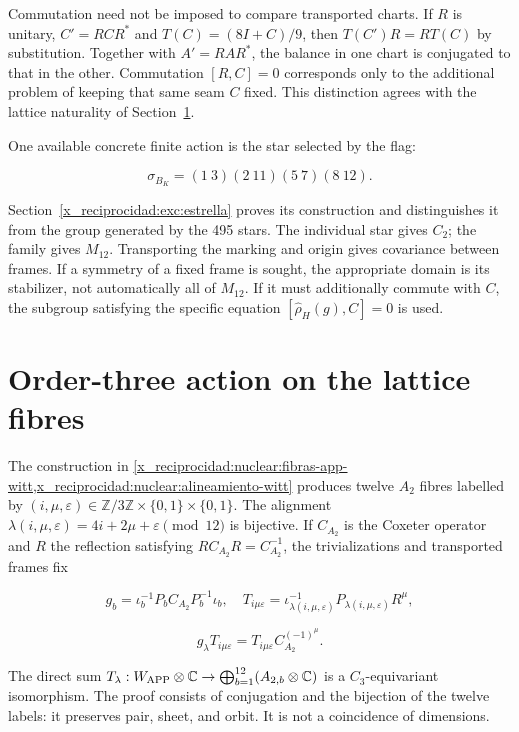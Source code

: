 Commutation need not be imposed to compare transported charts. If \(R\) is unitary, \(C'=RCR^*\) and \(T(C)=(8I+C)/9\), then \(T(C')R=RT(C)\) by substitution. Together with \(A'=RAR^*\), the balance in one chart is conjugated to that in the other. Commutation \([R,C]=0\) corresponds only to the additional problem of keeping that same seam \(C\) fixed. This distinction agrees with the lattice naturality of Section~\ref{x_reciprocidad:nuc04:c3}.

One available concrete finite action is the star selected by the flag:

\[
\sigma_{B_K}=(1\ 3)(2\ 11)(5\ 7)(8\ 12).
\]

Section~\ref{x_reciprocidad:exc:estrella} proves its construction and distinguishes it from the group generated by the 495 stars. The individual star gives \(C_2\); the family gives \(M_{12}\). Transporting the marking and origin gives covariance between frames. If a symmetry of a fixed frame is sought, the appropriate domain is its stabilizer, not automatically all of \(M_{12}\). If it must additionally commute with \(C\), the subgroup satisfying the specific equation \([\widehat\rho_H(g),C]=0\) is used.

\section{Order-three action on the lattice fibres}\label{x_reciprocidad:nuc04:c3}

The construction in \cref{x_reciprocidad:nuclear:fibras-app-witt,x_reciprocidad:nuclear:alineamiento-witt} produces twelve \(A_2\) fibres labelled by \((i,\mu,\varepsilon)\in\mathbb Z/3\mathbb Z\times\{0,1\}\times\{0,1\}\). The alignment \(\lambda(i,\mu,\varepsilon)=4i+2\mu+\varepsilon\pmod{12}\) is bijective. If \(C_{A_2}\) is the Coxeter operator and \(R\) the reflection satisfying \(RC_{A_2}R=C_{A_2}^{-1}\), the trivializations and transported frames fix

\[
g_b=\iota_b^{-1}P_bC_{A_2}P_b^{-1}\iota_b,
\quad T_{i\mu\varepsilon}=\iota_{\lambda(i,\mu,\varepsilon)}^{-1}P_{\lambda(i,\mu,\varepsilon)}R^\mu,
\]

\[
g_\lambda T_{i\mu\varepsilon}
=T_{i\mu\varepsilon}C_{A_2}^{(-1)^\mu}.
\]

The direct sum \(T_\lambda:W_{\rm APP}\otimes\mathbb C\to\bigoplus_{b=1}^{12}(A_{2,b}\otimes\mathbb C)\) is a \(C_3\)-equivariant isomorphism. The proof consists of conjugation and the bijection of the twelve labels: it preserves pair, sheet, and orbit. It is not a coincidence of dimensions.

